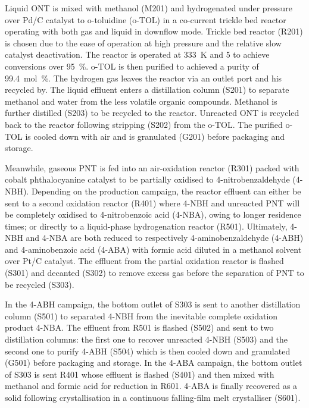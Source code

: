 Liquid ONT is mixed with methanol (M201) and hydrogenated under pressure over Pd/C catalyst to o-toluidine (o-TOL) in a co-current trickle bed reactor operating with both gas and liquid in downflow mode. Trickle bed reactor (R201) is chosen due to the ease of operation at high pressure and the relative slow catalyst deactivation. The reactor is operated at \SI{333}{\K} and \SI{5}{\atm} to achieve conversions over \SI{95}{\percent}. o-TOL is then purified to achieved a purity of \SI{99.4}{\mol\percent}. The hydrogen gas leaves the reactor via an outlet port and his recycled by. The liquid effluent enters a distillation column (S201) to separate methanol and water from the less volatile organic compounds. Methanol is further distilled (S203) to be recycled to the reactor. Unreacted ONT is recycled back to the reactor following stripping (S202) from the o-TOL. The purified o-TOL is cooled down with air and is granulated (G201) before packaging and storage.

Meanwhile, gaseous PNT is fed into an air-oxidation reactor (R301) packed with cobalt phthalocyanine catalyst to be partially oxidised to 4-nitrobenzaldehyde (4-NBH). Depending on the production campaign, the reactor effluent can either be sent to a second oxidation reactor (R401) where 4-NBH and unreacted PNT will be completely oxidised to 4-nitrobenzoic acid (4-NBA), owing to longer residence times; or directly to a liquid-phase hydrogenation reactor (R501). Ultimately, 4-NBH and 4-NBA are both reduced to respectively 4-aminobenzaldehyde (4-ABH) and 4-aminobenzoic acid (4-ABA) with formic acid diluted in a methanol solvent over Pt/C catalyst. The effluent from the partial oxidation reactor is flashed (S301) and decanted (S302) to remove excess gas before the separation of PNT to be recycled (S303). 

In the 4-ABH campaign, the bottom outlet of S303 is sent to another distillation column (S501) to separated 4-NBH from the inevitable complete oxidation product 4-NBA. The effluent from R501 is flashed (S502) and sent to two distillation columns: the first one to recover unreacted 4-NBH (S503) and the second one to purify 4-ABH (S504) which is then cooled down and granulated (G501) before packaging and storage.  
In the 4-ABA campaign, the bottom outlet of S303 is sent R401 whose effluent is flashed (S401) and then mixed with methanol and formic acid for reduction in R601. 4-ABA is finally recovered as a solid following  crystallisation in a continuous falling-film melt crystalliser (S601).

